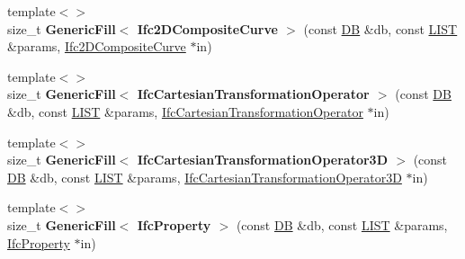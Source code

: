 \begin{DoxyCompactItemize}
\item 
\hypertarget{namespace_assimp_1_1_s_t_e_p_ad9ae65d01c501dcfbc09e886827d6064}{{\footnotesize template$<$$>$ }\\size\+\_\+t {\bfseries Generic\+Fill$<$ Ifc2\+D\+Composite\+Curve $>$} (const \hyperlink{class_assimp_1_1_s_t_e_p_1_1_d_b}{D\+B} \&db, const \hyperlink{class_assimp_1_1_s_t_e_p_1_1_e_x_p_r_e_s_s_1_1_l_i_s_t}{L\+I\+S\+T} \&params, \hyperlink{struct_assimp_1_1_i_f_c_1_1_ifc2_d_composite_curve}{Ifc2\+D\+Composite\+Curve} $\ast$in)}\label{namespace_assimp_1_1_s_t_e_p_ad9ae65d01c501dcfbc09e886827d6064}

\item 
\hypertarget{namespace_assimp_1_1_s_t_e_p_a3fd2b4dbd6e702e03b9b7aead5276ebb}{{\footnotesize template$<$$>$ }\\size\+\_\+t {\bfseries Generic\+Fill$<$ Ifc\+Cartesian\+Transformation\+Operator $>$} (const \hyperlink{class_assimp_1_1_s_t_e_p_1_1_d_b}{D\+B} \&db, const \hyperlink{class_assimp_1_1_s_t_e_p_1_1_e_x_p_r_e_s_s_1_1_l_i_s_t}{L\+I\+S\+T} \&params, \hyperlink{struct_assimp_1_1_i_f_c_1_1_ifc_cartesian_transformation_operator}{Ifc\+Cartesian\+Transformation\+Operator} $\ast$in)}\label{namespace_assimp_1_1_s_t_e_p_a3fd2b4dbd6e702e03b9b7aead5276ebb}

\item 
\hypertarget{namespace_assimp_1_1_s_t_e_p_ac90e980e48337ed3a022d3c2803752b1}{{\footnotesize template$<$$>$ }\\size\+\_\+t {\bfseries Generic\+Fill$<$ Ifc\+Cartesian\+Transformation\+Operator3\+D $>$} (const \hyperlink{class_assimp_1_1_s_t_e_p_1_1_d_b}{D\+B} \&db, const \hyperlink{class_assimp_1_1_s_t_e_p_1_1_e_x_p_r_e_s_s_1_1_l_i_s_t}{L\+I\+S\+T} \&params, \hyperlink{struct_assimp_1_1_i_f_c_1_1_ifc_cartesian_transformation_operator3_d}{Ifc\+Cartesian\+Transformation\+Operator3\+D} $\ast$in)}\label{namespace_assimp_1_1_s_t_e_p_ac90e980e48337ed3a022d3c2803752b1}

\item 
\hypertarget{namespace_assimp_1_1_s_t_e_p_a1b668cc18b2a7385252dbd92f86666d9}{{\footnotesize template$<$$>$ }\\size\+\_\+t {\bfseries Generic\+Fill$<$ Ifc\+Property $>$} (const \hyperlink{class_assimp_1_1_s_t_e_p_1_1_d_b}{D\+B} \&db, const \hyperlink{class_assimp_1_1_s_t_e_p_1_1_e_x_p_r_e_s_s_1_1_l_i_s_t}{L\+I\+S\+T} \&params, \hyperlink{struct_assimp_1_1_i_f_c_1_1_ifc_property}{Ifc\+Property} $\ast$in)}\label{namespace_assimp_1_1_s_t_e_p_a1b668cc18b2a7385252dbd92f86666d9}


\end{DoxyCompactItemize}
